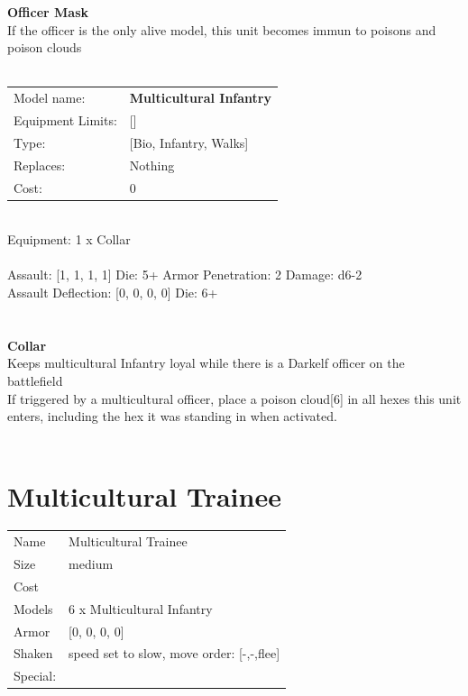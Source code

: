 {{\bf Officer Mask } \\

If the officer is the only alive model, this unit becomes immun to poisons and poison clouds\\ 





 
\ \\

\noindent
\begin{tabular}{ll}
Model name: &{\bf Multicultural Infantry } \\
Equipment Limits: &[] \\
Type: &[Bio, Infantry, Walks] \\
Replaces: &Nothing \\
Cost: & 0\\
\end{tabular}
\ \\
Equipment: 1 x Collar \\
\ \\
Assault: [1, 1, 1, 1] Die: 5+ Armor Penetration: 2 Damage: d6-2 \\
Assault Deflection: [0, 0, 0, 0] Die: 6+\\
\indent  
\ \\

\ \\
{\bf Collar } \\

Keeps multicultural Infantry loyal while there is a Darkelf officer on the battlefield\\ 
If triggered by a multicultural officer, place a poison cloud[6] in all hexes this unit enters, including the hex it was standing in when activated.\\ 





 
\ \\













\clearpage

\section{ Multicultural Trainee }

\begin{tabular}{ll}
  Name & Multicultural Trainee \\
  Size & medium\\
  Cost & \\
  Models & 6 x Multicultural Infantry\\
  Armor & [0, 0, 0, 0]\\
  Shaken & speed set to slow, move order: [-,-,flee]\\
  Special: \\
\end{tabular}

}
